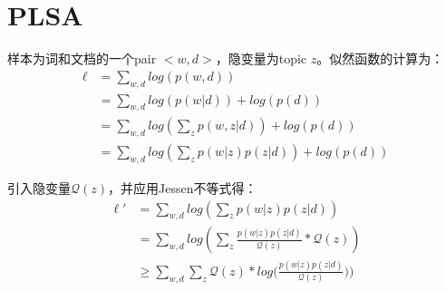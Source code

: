 
\section{PLSA}


样本为词和文档的一个pair $<w,d>$，隐变量为topic $z$。似然函数的计算为：
\begin{displaymath}
\begin{split}
\ell &= \sum_{w,d}{log(p(w,d))}\\
&= \sum_{w,d}{log(p(w|d)) + log(p(d))}\\
&= \sum_{w,d}{log(\sum_z{p(w,z|d)})+ log(p(d))}\\
&= \sum_{w,d}{log(\sum_z{p(w|z)p(z|d)})+ log(p(d))}
\end{split}
\end{displaymath} 

引入隐变量$\mathcal{Q}(z)$，并应用Jessen不等式得：
\begin{displaymath}
\begin{split}
\ell' &= \sum_{w,d}{log(\sum_z{p(w|z)p(z|d)})}\\
&=\sum_{w,d}{log(\sum_z{\frac{p(w|z)p(z|d)}{\mathcal{Q}(z)}*\mathcal{Q}(z)})}\\
&\geq \sum_{w,d}{\sum_z{\mathcal{Q}(z)*log(\frac{p(w|z)p(z|d)}{\mathcal{Q}(z)}}))}
\end{split}
\end{displaymath} 

